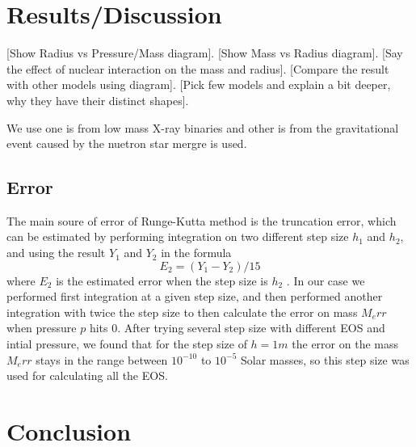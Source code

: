 \documentclass[11pt]{article}
\begin{document}
\section{Results/Discussion}
[Show Radius vs Pressure/Mass diagram]. [Show Mass vs Radius diagram].
[Say the effect of nuclear interaction on the mass and radius]. [Compare the result with other models using diagram]. [Pick few models and explain a bit deeper, why they have their distinct shapes].

            We use one is from low mass X-ray binaries and other is from the gravitational event caused by the nuetron star mergre is used.


        \subsection{Error}
            The main soure of error of Runge-Kutta method is the truncation error, which can be estimated by performing integration on two different step size $h_1$ and $h_2$, and using the result $Y_1$ and $Y_2$ in the formula \begin{equation}E_2=(Y_1-Y_2)/15\end{equation} where $E_2$ is the estimated error when the step size is $h_2$ \cite{Lotkin.1951/rk.accuracy}. In our case we performed first integration at a given step size, and then performed another integration with twice the step size to then calculate the error on mass $M_err$ when pressure $p$ hits 0. After trying several step size with different EOS and intial pressure, we found that for the step size of $h=1m$ the error on the mass $M_err$ stays in the range between $10^{-10}$ to $10^{-5}$ Solar masses, so this step size was used for calculating all the EOS.

\section{Conclusion}

%
\end{document}
